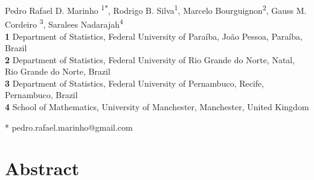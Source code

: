 \documentclass[10pt,letterpaper]{article}
\begin{document}
\vspace*{0.2in}

\begin{flushleft}
{\Large
\textbf{}}
\newline \vspace{0.3cm}

Pedro Rafael D. Marinho \textsuperscript{1${*}$},
Rodrigo B. Silva\textsuperscript{1},
Marcelo Bourguignon\textsuperscript{2},
Gauss M. Cordeiro \textsuperscript{3},
Saralees Nadarajah\textsuperscript{4}
\\
\bigskip
\textbf{1} Department of Statistics, Federal University of Para\'{i}ba, João Pessoa, Paraíba, Brazil
\\
\textbf{2} Department of Statistics, Federal University of Rio Grande do Norte, Natal, Rio Grande do Norte, Brazil
\\
\textbf{3} Department of Statistics, Federal University of Pernambuco, Recife, Pernambuco, Brazil
\\
\textbf{4} School of Mathematics, University of Manchester, Manchester, United Kingdom
\bigskip

* pedro.rafael.marinho@gmail.com

\end{flushleft}

\section*{Abstract}
\end{document}
